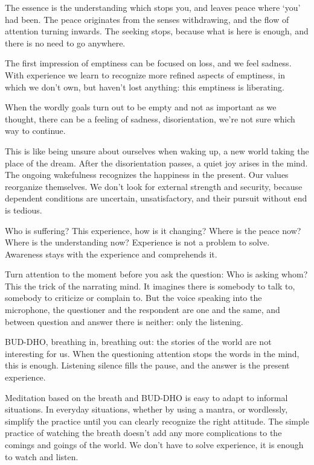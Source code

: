 The essence is the understanding which stops you, and leaves peace where
`you' had been. The peace originates from the senses withdrawing, and
the flow of attention turning inwards. The seeking stops, because what
is here is enough, and there is no need to go anywhere.


The first impression of emptiness can be focused on loss, and we feel
sadness. With experience we learn to recognize more refined aspects of
emptiness, in which we don't own, but haven't lost anything: this
emptiness is liberating.

When the wordly goals turn out to be empty and not as important as we
thought, there can be a feeling of sadness, disorientation, we're not
sure which way to continue.

This is like being unsure about ourselves when waking up, a new world
taking the place of the dream. After the disorientation passes, a quiet
joy arises in the mind. The ongoing wakefulness recognizes the happiness
in the present. Our values reorganize themselves. We don't look for
external strength and security, because dependent conditions are
uncertain, unsatisfactory, and their pursuit without end is tedious.

Who is suffering? This experience, how is it changing? Where is the
peace now? Where is the understanding now? Experience is not a problem
to solve. Awareness stays with the experience and comprehends it.

\enlargethispage*{2\baselineskip}

Turn attention to the moment before you ask the question: Who is asking
whom? This the trick of the narrating mind. It imagines there is
somebody to talk to, somebody to criticize or complain to. But the voice
speaking into the microphone, the questioner and the respondent are one
and the same, and between question and answer there is neither: only the
listening.


BUD-DHO, breathing in, breathing out: the stories of the world are not
interesting for us. When the questioning attention stops the words in
the mind, this is enough. Listening silence fills the pause, and the
answer is the present experience.

Meditation based on the breath and BUD-DHO is easy to adapt to informal
situations. In everyday situations, whether by using a mantra, or
wordlessly, simplify the practice until you can clearly recognize the
right attitude. The simple practice of watching the breath doesn't add
any more complications to the comings and goings of the world. We don't
have to solve experience, it is enough to watch and listen.

